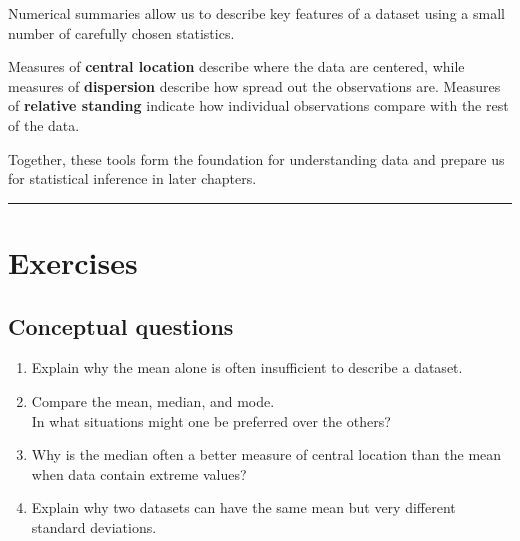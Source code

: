 \documentclass[
  letterpaper,
  DIV=11,
  numbers=noendperiod]{scrreprt}
\begin{document}
\begin{tcolorbox}[enhanced jigsaw, coltitle=black, colbacktitle=quarto-callout-important-color!10!white, left=2mm, bottomrule=.15mm, bottomtitle=1mm, colback=white, titlerule=0mm, colframe=quarto-callout-important-color-frame, breakable, leftrule=.75mm, toptitle=1mm, opacitybacktitle=0.6, rightrule=.15mm, title=\textcolor{quarto-callout-important-color}{\faExclamation}\hspace{0.5em}{Chapter summary}, arc=.35mm, opacityback=0, toprule=.15mm]

Numerical summaries allow us to describe key features of a dataset using
a small number of carefully chosen statistics.

Measures of \textbf{central location} describe where the data are
centered, while measures of \textbf{dispersion} describe how spread out
the observations are. Measures of \textbf{relative standing} indicate
how individual observations compare with the rest of the data.

Together, these tools form the foundation for understanding data and
prepare us for statistical inference in later chapters.

\end{tcolorbox}

\begin{center}\rule{0.5\linewidth}{0.5pt}\end{center}

\section{Exercises}\label{exercises-1}

\subsection{Conceptual questions}\label{conceptual-questions-1}

\begin{enumerate}
\def\labelenumi{\arabic{enumi}.}
\item
  Explain why the mean alone is often insufficient to describe a
  dataset.
\item
  Compare the mean, median, and mode.\\
  In what situations might one be preferred over the others?
\item
  Why is the median often a better measure of central location than the
  mean when data contain extreme values?
\item
  Explain why two datasets can have the same mean but very different
  standard deviations.
\end{enumerate}
\end{document}
